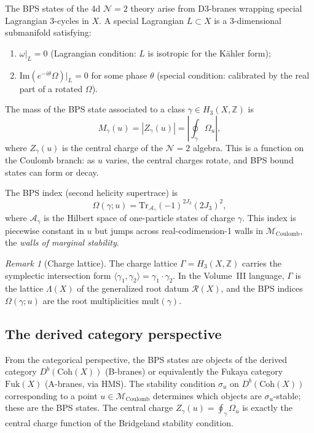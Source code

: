 \documentclass[11pt]{article}
\theoremstyle{definition}
\theoremstyle{remark}
\newtheorem{remark}[theorem]{Remark}
\newcommand{\cA}{\mathcal{A}}
\newcommand{\cM}{\mathcal{M}}
\newcommand{\cN}{\mathcal{N}}
\newcommand{\Tr}{\mathrm{Tr}}
\newcommand{\Fuk}{\mathrm{Fuk}}
\newcommand{\Coh}{\mathrm{Coh}}
\newcommand{\Coulomb}{\mathrm{Coulomb}}
\begin{document}
The BPS states of the 4d $\cN=2$ theory arise from D3-branes wrapping special Lagrangian
3-cycles in $X$. A special Lagrangian $L \subset X$ is a 3-dimensional submanifold satisfying:
\begin{enumerate}[label=(\roman*),nosep]
 \item $\omega|_L = 0$ (Lagrangian condition: $L$ is isotropic for the K\"ahler form);
 \item $\mathrm{Im}(e^{-i\theta}\Omega)|_L = 0$ for some phase $\theta$ (special condition: calibrated
 by the real part of a rotated $\Omega$).
\end{enumerate}
The mass of the BPS state associated to a class $\gamma \in H_3(X, \mathbb{Z})$ is
\begin{equation}
 \label{eq:bps-mass}
 M_\gamma(u) = |Z_\gamma(u)| = \left| \oint_\gamma \Omega_u \right|,
\end{equation}
where $Z_\gamma(u)$ is the central charge of the $\cN=2$ algebra. This is a function on the
Coulomb branch: as $u$ varies, the central charges rotate, and BPS bound states can form or decay.

The BPS index (second helicity supertrace) is
\begin{equation}
 \label{eq:bps-index}
 \Omega(\gamma; u) = \Tr_{\cA_\gamma} (-1)^{2J_3} (2J_3)^2,
\end{equation}
where $\cA_\gamma$ is the Hilbert space of one-particle states of charge $\gamma$. This index is
piecewise constant in $u$ but jumps across real-codimension-1 walls in $\cM_{\Coulomb}$, the
\emph{walls of marginal stability}.

\begin{remark}[Charge lattice]
 \label{rem:charge-lattice}
 The charge lattice $\Gamma = H_3(X, \mathbb{Z})$ carries the symplectic intersection form
 $\langle \gamma_1, \gamma_2 \rangle = \gamma_1 \cdot \gamma_2$. In the Volume~III language,
 $\Gamma$ is the lattice $\Lambda(X)$ of the generalized root datum $\mathcal{R}(X)$, and the
 BPS indices $\Omega(\gamma; u)$ are the root multiplicities $\mathrm{mult}(\gamma)$.
\end{remark}

\subsection{The derived category perspective}
\label{subsec:derived-category}

From the categorical perspective, the BPS states are objects of the derived category
$D^b(\Coh(X))$ (B-branes) or equivalently the Fukaya category $\Fuk(X)$ (A-branes, via HMS).
The stability condition $\sigma_u$ on $D^b(\Coh(X))$ corresponding to a point $u \in \cM_{\Coulomb}$
determines which objects are $\sigma_u$-stable; these are the BPS states. The central charge
$Z_\gamma(u) = \oint_\gamma \Omega_u$ is exactly the central charge function of the Bridgeland
stability condition.
\end{document}
